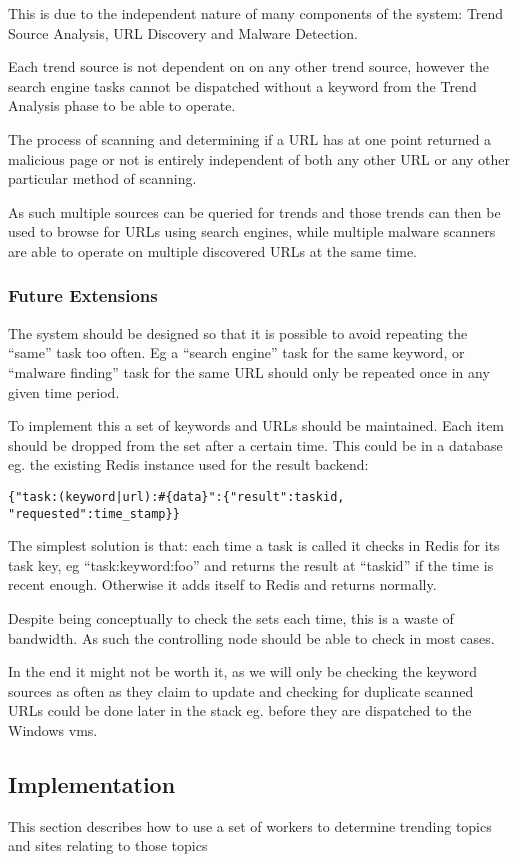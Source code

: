 This is due to the independent nature of many components of the system: Trend Source Analysis, URL Discovery and Malware Detection.

Each trend source is not dependent on on any other trend source, however the search engine tasks cannot be dispatched without a keyword from the Trend Analysis phase to be able to operate.

The process of scanning and determining if a URL has at one point returned a malicious page or not is entirely independent of both any other URL or any other particular method of scanning.

As such multiple sources can be queried for trends and those trends can then be used to browse for URLs using search engines, while multiple malware scanners are able to operate on multiple discovered URLs at the same time.

\subsubsection{Future Extensions}
The system should be designed so that it is possible to avoid repeating the ``same'' task too often. Eg a ``search engine'' task for the same keyword, or ``malware finding'' task for the same URL should only be repeated once in any given time period.

To implement this a set of keywords and URLs should be maintained. Each item should be dropped from the set after a certain time. This could be in a database eg. the existing Redis instance used for the result backend:

\verb/{"task:(keyword|url):#{data}":{"result":taskid, "requested":time_stamp}}/

The simplest solution is that: each time a task is called it checks in Redis for its task key, eg ``task:keyword:foo'' and returns the result at ``taskid'' if the time is recent enough. Otherwise it adds itself to Redis and returns normally.

Despite being conceptually to check the sets each time, this is a waste of bandwidth. As such the controlling node should be able to check in most cases.

In the end it might not be worth it, as we will only be checking the keyword sources as often as they claim to update and checking for duplicate scanned URLs could be done later in the stack eg. before they are dispatched to the Windows vms.

\subsection{Implementation}
This section describes how to use a set of workers to determine trending topics and sites relating to those topics
